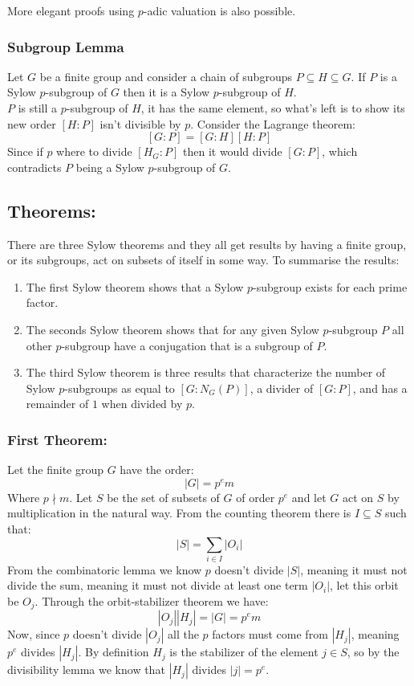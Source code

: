 More elegant proofs using $p$-adic valuation is also possible.

\subsubsection{Subgroup Lemma}
Let $G$ be a finite group and consider a chain of subgroups $P\subseteq H\subseteq G$.
If $P$ is a Sylow $p$-subgroup of $G$ then it is a Sylow $p$-subgroup of $H$.
\\

$P$ is still a $p$-subgroup of $H$,
it has the same element,
so what's left is to show its new order $[H:P]$ isn't divisible by $p$.
Consider the Lagrange theorem:
\[[G:P] = [G:H][H:P]\]
Since if $p$ where to divide $[H_G:P]$ then it would divide $[G:P]$,
which contradicts $P$ being a Sylow $p$-subgroup of $G$.

\subsection{Theorems:}
There are three Sylow theorems and they all get results by having a finite group,
or its subgroups,
act on subsets of itself in some way.
To summarise the results:
\begin{enumerate}
	\item The first Sylow theorem shows that a Sylow $p$-subgroup exists for each prime factor.
	\item The seconds Sylow theorem shows that for any given Sylow $p$-subgroup $P$ all other $p$-subgroup have a conjugation that is a subgroup of $P$.
	\item The third Sylow theorem is three results that characterize the number of Sylow $p$-subgroups as equal to $[G:N_G(P)]$, a divider of $[G:P]$, and has a remainder of $1$ when divided by $p$.
\end{enumerate}

\subsubsection{First Theorem:}
Let the finite group $G$ have the order:
\[|G| = p^em\]
Where $p\nmid m$.
Let $S$ be the set of subsets of $G$ of order $p^e$ and let $G$ act on $S$ by multiplication in the natural way.
From the counting theorem there is $I\subseteq S$ such that:
\[|S| = \sum_{i\in I}|O_i|\]
From the combinatoric lemma we know $p$ doesn't divide $|S|$,
meaning it must not divide the sum,
meaning it must not divide at least one term $|O_i|$,
let this orbit be $O_j$.
Through the orbit-stabilizer theorem we have:
\[|O_j||H_j| = |G| = p^em\]
Now,
since $p$ doesn't divide $|O_j|$ all the $p$ factors must come from $|H_j|$,
meaning $p^e$ divides $|H_j|$.
By definition $H_j$ is the stabilizer of the element $j\in S$,
so by the divisibility lemma we know that $|H_j|$ divides $|j|=p^e$.
\\

